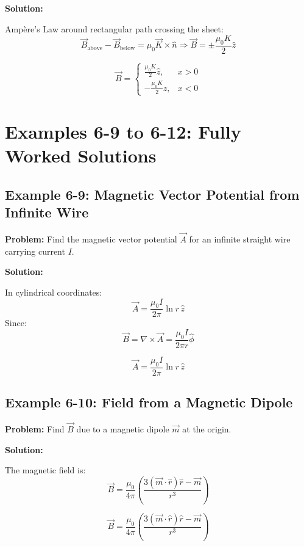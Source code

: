 \documentclass[12pt]{article}
\begin{document}
\textbf{Solution:}

Ampère’s Law around rectangular path crossing the sheet:
\[
\vec{B}_{\text{above}} - \vec{B}_{\text{below}} = \mu_0 \vec{K} \times \hat{n}
\Rightarrow \vec{B} = \pm \frac{\mu_0 K}{2} \hat{z}
\]

\begin{tcolorbox}
\[
\boxed{
\vec{B} =
\begin{cases}
\frac{\mu_0 K}{2} \hat{z}, & x > 0 \\
-\frac{\mu_0 K}{2} \hat{z}, & x < 0
\end{cases}
}
\]
\end{tcolorbox}



\section*{Examples 6-9 to 6-12: Fully Worked Solutions}

\subsection*{Example 6-9: Magnetic Vector Potential from Infinite Wire}

\textbf{Problem:}  
Find the magnetic vector potential \( \vec{A} \) for an infinite straight wire carrying current \( I \).

\textbf{Solution:}

In cylindrical coordinates:
\[
\vec{A} = \frac{\mu_0 I}{2\pi} \ln r \, \hat{z}
\]
Since:
\[
\vec{B} = \nabla \times \vec{A} = \frac{\mu_0 I}{2\pi r} \hat{\phi}
\]

\begin{tcolorbox}
\[
\boxed{\vec{A} = \frac{\mu_0 I}{2\pi} \ln r \, \hat{z}}
\]
\end{tcolorbox}

\subsection*{Example 6-10: Field from a Magnetic Dipole}

\textbf{Problem:}  
Find \( \vec{B} \) due to a magnetic dipole \( \vec{m} \) at the origin.

\textbf{Solution:}

The magnetic field is:
\[
\vec{B} = \frac{\mu_0}{4\pi} \left( \frac{3(\vec{m} \cdot \hat{r})\hat{r} - \vec{m}}{r^3} \right)
\]

\begin{tcolorbox}
\[
\boxed{
\vec{B} = \frac{\mu_0}{4\pi} \left( \frac{3(\vec{m} \cdot \hat{r})\hat{r} - \vec{m}}{r^3} \right)
}
\]
\end{tcolorbox}
\end{document}
